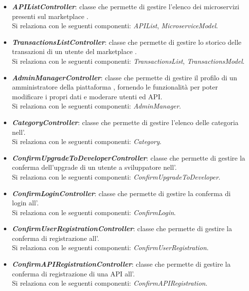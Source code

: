 \begin{itemize}
\begin{itemize}
		\item \textbf{\textit{APIListController}}: classe che permette di gestire l'elenco dei microservizi presenti sul marketplace \progetto.\\
		Si relaziona con le seguenti componenti: \textit{APIList}, \textit{MicroserviceModel}.
		
		\item \textbf{\textit{TransactionsListController}}: classe che permette di gestire lo storico delle transazioni di un utente del marketplace \progetto.\\
		Si relaziona con le seguenti componenti: \textit{TransactionsList}, \textit{TransactionsModel}.
		
		\item \textbf{\textit{AdminManagerController}}: classe che permette di gestire il profilo di un amministratore della piattaforma \progetto, fornendo le funzionalità per poter modificare i propri dati e moderare utenti ed API.\\
		Si relaziona con le seguenti componenti: \textit{AdminManager}.
		
		\item \textbf{\textit{CategoryController}}: classe che permette di gestire l'elenco delle categoria nell'\progetto.\\
		Si relaziona con le seguenti componenti: \textit{Category}.
		
		\item \textbf{\textit{ConfirmUpgradeToDeveloperController}}: classe che permette di gestire la conferma dell'upgrade di un utente a sviluppatore nell'\progetto.\\
		Si relaziona con le seguenti componenti: \textit{ConfirmUpgradeToDeveloper}.
		
		\item \textbf{\textit{ConfirmLoginController}}: classe che permette di gestire la conferma di login all'\progetto.\\
		Si relaziona con le seguenti componenti: \textit{ConfirmLogin}.
		
		\item \textbf{\textit{ConfirmUserRegistrationController}}: classe che permette di gestire la conferma di registrazione all'\progetto.\\
		Si relaziona con le seguenti componenti: \textit{ConfirmUserRegistration}.
		
		\item \textbf{\textit{ConfirmAPIRegistrationController}}: classe che permette di gestire la conferma di registrazione di una API all'\progetto.\\
		Si relaziona con le seguenti componenti: \textit{ConfirmAPIRegistration}.
		

\end{itemize}
\end{itemize}
